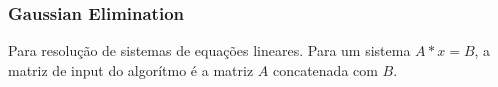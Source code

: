 \divisor
\subsubsection{Gaussian Elimination}
Para resolu\c{c}\~{a}o de sistemas de equa\c{c}\~{o}es lineares. Para um sistema $A*x = B$, a matriz de input do algor\'{i}tmo \'{e} a matriz $A$ concatenada com $B$.

\divisor
